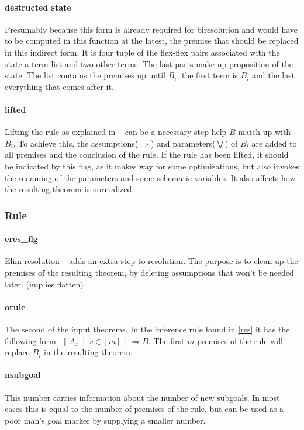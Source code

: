 \paragraph{destructed state}
Presumably because this form is already required for biresolution and would have to be computed in this function at the latest, the premise that should be replaced in this indirect form. It is four tuple of the flex-flex pairs associated with the state a term list and two other terms. The last parts make up proposition of the state. The list contains the premises up until $B_i$, the first term is $B_i$ and the last everything that comes after it. 
\paragraph{lifted}
Lifting the rule as explained in ~\parencite{Paulson1994} can be a necessary step help $B$ match up with $B_i$. To achieve this, the assumptions($\Longrightarrow$) and parameters($\bigvee$) of $B_i$ are added to all premises and the conclusion of the rule. If the rule has been lifted, it should be indicated by this flag, as it makes way for some optimizations, but also invokes the renaming of the parameters and some schematic variables. It also affects how the resulting theorem is normalized.

\subsubsection{Rule}
\paragraph{eres\_flg}
Elim-resolution ~\parencite{Paulson1994} adds an extra step to resolution. The purpose is to clean up the premises of the resulting theorem, by deleting assumptions that won't be needed later. (implies flatten)
\paragraph{orule}
The second of the input theorems. In the inference rule found in \ref{res} it has the following form. $\left\llbracket A_x\,\middle|\, x \in \left[ m \right] \right\rrbracket \Longrightarrow B$. The first $m$ premises of the rule will replace $B_i$ in the resulting theorem.
\paragraph{nsubgoal}
This number carries information about the number of new subgoals. In most cases this is equal to the number of premises of the rule, but can be used as a poor man's goal marker by supplying a smaller number.


